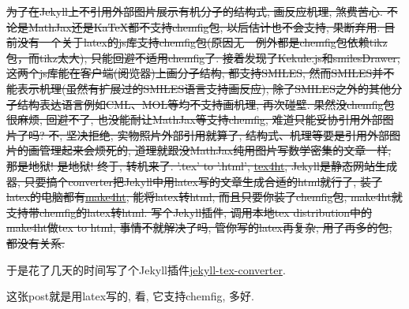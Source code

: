 \documentclass{article}
\begin{document}
\sout{为了在Jekyll上不引用外部图片展示有机分子的结构式, 画反应机理, 煞费苦心. 不论是MathJax还是KaTeX都不支持chemfig包, 以后估计也不会支持, 果断弃用. 目前没有一个关于latex的js库支持chemfig包(原因无一例外都是chemfig包依赖tikz包，而tikz太大), 只能回避不适用chemfig了. 接着发现了Kekule.js和smilesDrawer, 这两个js库能在客户端(阅览器)上画分子结构, 都支持SMILES, 然而SMILES并不能表示机理(虽然有扩展过的SMILES语言支持画反应), 除了SMILES之外的其他分子结构表达语言例如CML、MOL等均不支持画机理, 再次碰壁. 果然没chemfig包很麻烦, 回避不了, 也没能耐让MathJax等支持chemfig, 难道只能妥协引用外部图片了吗? 不, 坚决拒绝, 实物照片外部引用就算了, 结构式、机理等要是引用外部图片的画管理起来会烦死的, 道理就跟没MathJax纯用图片写数学密集的文章一样, 那是地狱! 是地狱! 终于, 转机来了. '.tex' to '.html', \href{https://www.ctan.org/pkg/tex4ht}{tex4ht}, Jekyll是静态网站生成器, 只要搞个converter把Jekyll中用latex写的文章生成合适的html就行了, 装了latex的电脑都有\href{https://www.ctan.org/pkg/make4ht}{make4ht}, 能将latex转html, 而且只要你装了chemfig包, make4ht就支持带chemfig的latex转html. 写个Jekyll插件, 调用本地tex distribution中的make4ht做tex to html, 事情不就解决了吗, 管你写的latex再复杂, 用了再多的包, 都没有关系.}

于是花了几天的时间写了个Jekyll插件\href{https://github.com/crow02531/jekyll-tex-converter}{jekyll-tex-converter}.

这张post就是用latex写的, 看, 它支持chemfig, 多好.

\end{document}
